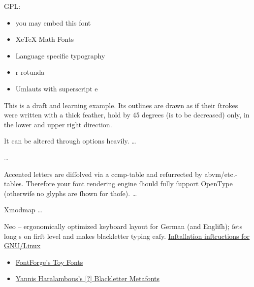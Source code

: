 \documentclass[ngerman,titlepage=on]{scrartcl}
\begin{document}
GPL:
\begin{itemize}
\item you may embed this font
\end{itemize}




\begin{itemize}
\item XeTeX Math Fonts
\item Language specific typography
\item r rotunda
\item Umlauts with superscript e
\end{itemize}





This is a draft and learning example. Its outlines are drawn as if their ſtrokes
were written with a thick feather, hold by 45 degrees (is to be decreased) only,
in the lower and upper right direction.

It can be altered through options heavily.
…




…




Accented letters are diſſolved via a ccmp-table and reſurrected by
abvm/etc.-tables. Therefore your font rendering engine ſhould fully ſupport
OpenType (otherwiſe no glyphs are ſhown for thoſe).
…




Xmodmap
…

Neo – ergonomically optimized keyboard layout for German (and Engliſh);
ſets long s on firſt level and makes blackletter typing eaſy.
\href{http://wiki.neo-layout.org/wiki/Neo\%20unter\%20Linux\%20einrichten/Lang-s-Tastatur}{Inſtallation inſtructions for GNU/Linux}




\begin{itemize}
\item \href{http://fontforge.ſourceforge.net/sfds/toyfonts.html}{FontForge’s Toy
Fonts}
\item \href{http://www.ctan.org/tex-archive/fonts/gothic/yfrak/}{Yannis
Haralambous’s [?] Blackletter Metafonts}
\end{itemize}
\end{document}
